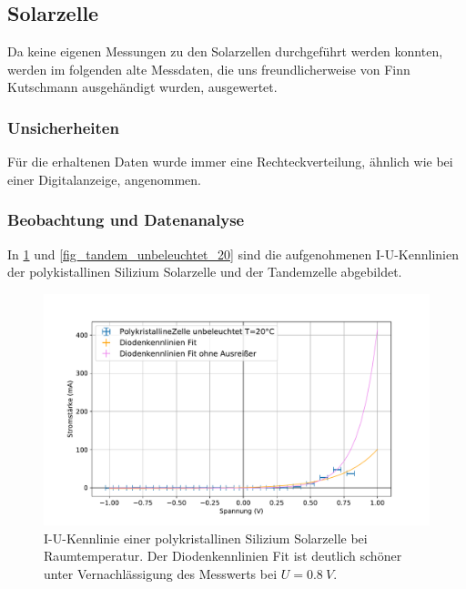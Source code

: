 \documentclass[
	a4paper,
	12pt,
	pagesize,
	ngerman
]{scrartcl}
\begin{document}
	\subsection{Solarzelle}

	Da keine eigenen Messungen zu den Solarzellen durchgeführt werden konnten, werden im folgenden alte Messdaten, die uns freundlicherweise von Finn Kutschmann ausgehändigt wurden, ausgewertet. %
	\subsubsection{Unsicherheiten}
	Für die erhaltenen Daten wurde immer eine Rechteckverteilung, ähnlich wie bei einer Digitalanzeige, angenommen.
	\subsubsection{Beobachtung und Datenanalyse}

	In \cref{fig_poly_unbeleuchtet_20} und \cref{fig_tandem_unbeleuchtet_20} sind die aufgenohmenen I-U-Kennlinien der polykistallinen Silizium Solarzelle und der Tandemzelle abgebildet.

	\begin{figure}[H]
			\includegraphics[width=.9\linewidth]{img/PolykristallineZelle_unbeleuchtet_20.pdf}
			\caption{
				I-U-Kennlinie einer polykristallinen Silizium Solarzelle bei Raumtemperatur.
				Der Diodenkennlinien Fit ist deutlich schöner unter Vernachlässigung des Messwerts bei $U=\SI{0.8}{V}$. %
								}
			\label{fig_poly_unbeleuchtet_20}
	\end{figure}
\end{document}
